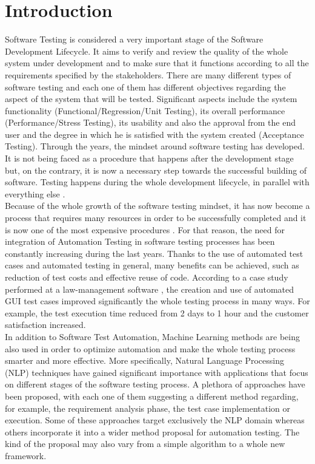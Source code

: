 \chapter{Introduction}

Software Testing is considered a very important stage of the Software Development Lifecycle. It aims to verify and review the quality of the whole system 
under development and to make sure that it functions according to all the requirements specified by the stakeholders. There are many different types of software testing and each 
one of them has different objectives regarding the aspect of the system that will be tested. Significant aspects include the system functionality 
(Functional/Regression/Unit Testing), its overall performance (Performance/Stress Testing), its usability and also the approval from the end user and 
the degree in which he is satisfied with the system created (Acceptance Testing). Through the years, the mindset around software testing 
has developed. It is not being faced as a procedure that happens after the development stage but, on the contrary, it is now a necessary 
step towards the successful building of software. Testing happens during the whole development lifecycle, in parallel with everything else \cite{swebok}.  \\

Because of the whole growth of the software testing mindset, it has now become a process that requires many resources in order to be successfully
 completed and it is now one of the most expensive procedures \cite{testautomation}. For that reason, the need for integration of Automation Testing in software testing
  processes has been constantly increasing during the last years. Thanks to the use of automated test cases and automated testing in general, many benefits can be achieved, such 
  as reduction of test costs and effective reuse of code. According to a case study performed at a law-management software \cite{introautotesting}, the creation and
   use of automated GUI test cases improved significantly the whole testing process in many ways. For example, the test execution time reduced from 2 days to 1 hour and the 
   customer satisfaction increased. \\

In addition to Software Test Automation, Machine Learning methods are being also used in order to optimize automation and make the whole testing process smarter and more 
effective. More specifically, Natural Language Processing (NLP) techniques have gained significant importance with applications that focus on different stages of the software testing process. 
A plethora of approaches have been proposed, with each one of them suggesting a different method regarding, for example, the requirement analysis phase, the test case implementation or execution. 
Some of these approaches target exclusively the NLP domain whereas others incorporate it into a wider method proposal for automation testing. The kind of the proposal may also vary from a simple 
algorithm to a whole new framework. \\

